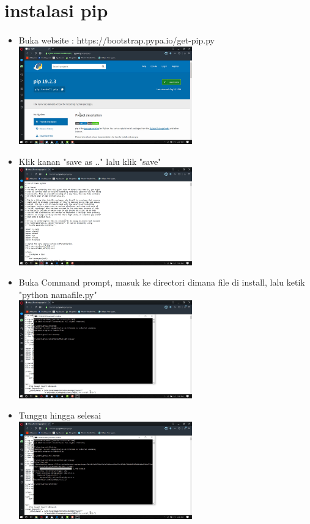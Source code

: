 \documentclass[a4paper,12pt]{report}
\begin{document}
\section{instalasi pip}
\paragraph{}
\begin{itemize}
	\item Buka website : https://bootstrap.pypa.io/get-pip.py\\
	\includegraphics[width=7.5cm]{gambar/pip/Screenshot (76).png} 
	\item Klik kanan "save as .."  lalu klik "save"\\
	\includegraphics[width=7.5cm]{gambar/pip/Screenshot (77).png} 
	\item Buka Command prompt, masuk ke directori dimana file di install, lalu ketik "python namafile.py"\\
	\includegraphics[width=7.5cm]{gambar/pip/Screenshot (78).png} 
	\item Tunggu hingga selesai\\
	\includegraphics[width=7.5cm]{gambar/pip/Screenshot (79).png} 
\end{itemize}
\end{document}
